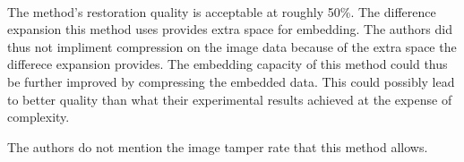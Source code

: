 \documentclass[a4paper]{article}
\begin{document}
\hspace{0pt} \\
The method's restoration quality is acceptable at roughly 50\%. 
The difference expansion this method uses provides extra space for embedding.
The authors did thus not impliment compression on the image data because of the extra space the differece expansion provides.
The embedding capacity of this method could thus be further improved by compressing the embedded data. This could possibly lead to better quality than what their experimental results achieved at the expense of complexity.

The authors do not mention the image tamper rate that this method allows.



\end{document}
